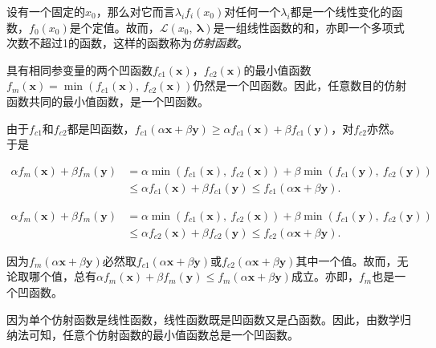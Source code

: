设有一个固定的$x_0$，那么对它而言$\lambda_i f_i(x_0)$对任何一个$\lambda_i$都是一个线性变化的函数，$f_0(x_0)$是个定值。故而，$\mathcal{L}(x_0,~\bm{\lambda})$是一组线性函数的和，亦即一个多项式次数不超过1的函数，这样的函数称为\emph{仿射函数}。

\begin{lemma}[仿射函数的凹性质] \label{lem:c5:AffineConcave}
	具有相同参变量的两个凹函数$f_{c1}(\mathbf{x})$，$f_{c2}(\mathbf{x})$的最小值函数$f_m(\mathbf{x})=\min(f_{c1}(\mathbf{x}),~f_{c2}(\mathbf{x}))$仍然是一个凹函数。因此，任意数目的仿射函数共同的最小值函数，是一个凹函数。
\end{lemma}

由于$f_{c1}$和$f_{c2}$都是凹函数，$f_{c1}(\alpha\mathbf{x} + \beta\mathbf{y}) \geqslant \alpha f_{c1}(\mathbf{x}) + \beta f_{c1}(\mathbf{y})$，对$f_{c2}$亦然。于是

\begin{equation}\label{fml:c5:affineConcave1}
	\begin{aligned} 
		\alpha f_{m}(\mathbf{x}) + \beta f_{m}(\mathbf{y}) &= \alpha \min( f_{c1}(\mathbf{x}),~f_{c2}(\mathbf{x})) + \beta \min( f_{c1}(\mathbf{y}),~f_{c2}(\mathbf{y})) \\
		&\leqslant \alpha f_{c1}(\mathbf{x}) + \beta f_{c1}(\mathbf{y}) \leqslant f_{c1}(\alpha\mathbf{x} + \beta\mathbf{y}).
	\end{aligned}
\end{equation}

\begin{equation}\label{fml:c5:affineConcave2}
	\begin{aligned} 
		\alpha f_{m}(\mathbf{x}) + \beta f_{m}(\mathbf{y}) &= \alpha \min( f_{c1}(\mathbf{x}),~f_{c2}(\mathbf{x})) + \beta \min( f_{c1}(\mathbf{y}),~f_{c2}(\mathbf{y})) \\
		&\leqslant \alpha f_{c2}(\mathbf{x}) + \beta f_{c2}(\mathbf{y}) \leqslant f_{c2}(\alpha\mathbf{x} + \beta\mathbf{y}).
	\end{aligned}
\end{equation}

因为$f_m(\alpha\mathbf{x} + \beta\mathbf{y})$必然取$f_{c1}(\alpha\mathbf{x} + \beta\mathbf{y})$或$f_{c2}(\alpha\mathbf{x} + \beta\mathbf{y})$其中一个值。故而，无论取哪个值，总有$\alpha f_{m}(\mathbf{x}) + \beta f_{m}(\mathbf{y}) \leqslant f_m(\alpha\mathbf{x} + \beta\mathbf{y})$成立。亦即，$f_m$也是一个凹函数。

因为单个仿射函数是线性函数，线性函数既是凹函数又是凸函数。因此，由数学归纳法可知，任意个仿射函数的最小值函数总是一个凹函数。

